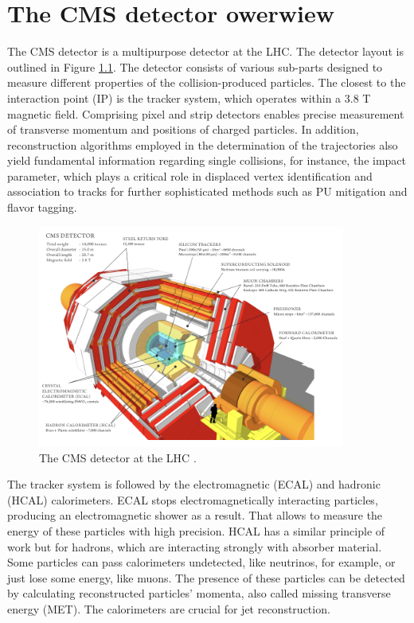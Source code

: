 
\chapter{The CMS detector owerwiew}

The CMS detector is a multipurpose detector at the LHC. The detector layout is outlined in Figure \ref{fig:CMS_detector}. The detector consists of various sub-parts designed to measure different properties of the collision-produced particles. The closest to the interaction point (IP) is the tracker system, which operates within a 3.8 T magnetic field. Comprising pixel and strip detectors enables precise measurement of transverse momentum and positions of charged particles. In addition, reconstruction algorithms employed in the determination of the trajectories also yield fundamental information regarding single collisions, for instance, the impact parameter, which plays a critical role in displaced vertex identification and association to tracks for further sophisticated methods such as PU mitigation and flavor tagging.

\begin{figure}[h]
    \centering
    \includegraphics[width=0.9\textwidth]{images/CMS_detector.png}
    \caption{The CMS detector at the LHC \cite{Ghosh_2019}.}
    \label{fig:CMS_detector}
\end{figure}

The tracker system is followed by the electromagnetic (ECAL) and hadronic (HCAL) calorimeters. ECAL stops electromagnetically interacting particles, producing an electromagnetic shower as a result. That allows to measure the energy of these particles with high precision. HCAL has a similar principle of work but for hadrons, which are interacting strongly with absorber material. Some particles can pass calorimeters undetected, like neutrinos, for example, or just lose some energy, like muons. The presence of these particles can be detected by calculating reconstructed particles' momenta, also called missing transverse energy (MET). The calorimeters are crucial for jet reconstruction.

